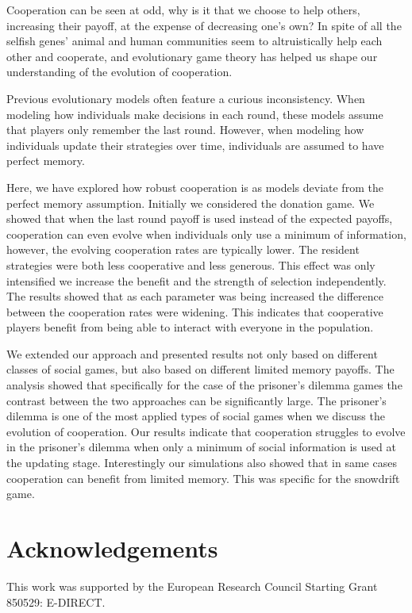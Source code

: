\documentclass[11pt]{article}
\theoremstyle{plainCl1}
\theoremstyle{plainCl2}
\begin{document}
Cooperation can be seen at odd, why is it that we choose to help others,
increasing their payoff, at the expense of decreasing one's own? In spite of all
the selfish genes’ animal and human communities seem to altruistically help each
other and cooperate, and evolutionary game theory has helped us shape our
understanding of the evolution of cooperation.

Previous evolutionary models often feature a curious inconsistency. When
modeling how individuals make decisions in each round, these models assume that
players only remember the last round. However, when modeling how individuals
update their strategies over time, individuals are assumed to have perfect
memory.

Here, we have explored how robust cooperation is as models deviate from the
perfect memory assumption. Initially we considered the donation game. We showed
that when the last round payoff is used instead of the expected payoffs,
cooperation can even evolve when individuals only use a minimum of information,
however, the evolving cooperation rates are typically lower. The resident
strategies were both less cooperative and less generous. This effect was only
intensified we increase the benefit and the strength of selection independently.
The results showed that as each parameter was being increased the difference
between the cooperation rates were widening. This indicates that cooperative
players benefit from being able to interact with everyone in the population.

We extended our approach and presented results not only based on different
classes of social games, but also based on different limited memory payoffs. The
analysis showed that specifically for the case of the prisoner's dilemma games
the contrast between the two approaches can be significantly large. The
prisoner's dilemma is one of the most applied types of social games when we
discuss the evolution of cooperation. Our results indicate that cooperation
struggles to evolve in the prisoner's dilemma when only a minimum of social
information is used at the updating stage. Interestingly our simulations also
showed that in same cases cooperation can benefit from limited memory. This was
specific for the snowdrift game.

\section{Acknowledgements}

This work was supported by the European Research Council Starting Grant 850529:
E-DIRECT.
\end{document}
